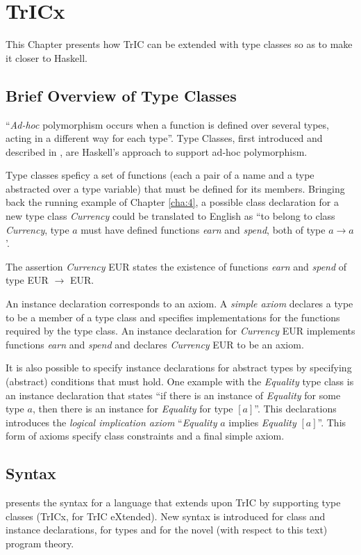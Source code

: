 \chapter{TrICx}
\label{cha:7}
This Chapter presents how TrIC can be extended with type classes so as to make it closer to Haskell.
\section{Brief Overview of Type Classes}
``\textit{Ad-hoc} polymorphism \cite{strachey} occurs when a function is defined over several types, acting in a different way for each type''. Type Classes, first introduced and described in \cite{adhoc}, are Haskell's approach to support ad-hoc polymorphism.

Type classes speficy a set of functions (each a pair of a name and a type abstracted over a type variable) that must be defined for its members. Bringing back the running example of Chapter \ref{cha:4}, a possible class declaration for a new type class \textit{Currency} could be translated to English as ``to belong to class \textit{Currency}, type $a$ must have defined functions \textit{earn} and \textit{spend}, both of type $a \to a$'.

The assertion \textit{Currency} EUR states the existence of functions \textit{earn} and \textit{spend} of type EUR $\to$ EUR. 

An instance declaration corresponds to an axiom. A \textit{simple axiom} declares a type to be a member of a type class and specifies implementations for the functions required by the type class. An instance declaration for \textit{Currency} EUR implements functions \textit{earn} and \textit{spend} and declares \textit{Currency} EUR to be an axiom.

It is also possible to specify instance declarations for abstract types by specifying (abstract) conditions that must hold. One example with the \textit{Equality} type class is an instance declaration that states ``if there is an instance of \textit{Equality} for some type $a$, then there is an instance for \textit{Equality} for type $[a]$''. This declarations introduces the \textit{logical implication axiom} ``\textit{Equality} $a$ implies \textit{Equality} $[a]$''. This form of axioms specify class constraints and a final simple axiom.

\section{Syntax}
 presents the syntax for a language that extends upon TrIC by supporting type classes (TrICx, for TrIC eXtended). New syntax is introduced for class and instance declarations, for types and for the novel (with respect to this text) program theory. 

